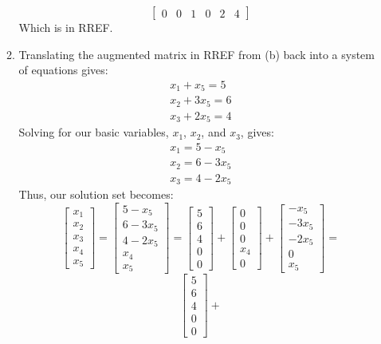 \documentclass{article}
\begin{document}
\begin{enumerate}
\begin{enumerate}
$$\begin{bmatrix}
            0 & 0 & 1 & 0 & 2 & 4
        \end{bmatrix}$$
        Which is in RREF. 
        \item Translating the augmented matrix in RREF from (b) back into a system of equations gives:
        \begin{align*}
            x_1 + x_5 = 5 \\ 
            x_2 + 3x_5 = 6 \\ 
            x_3 + 2x_5 = 4
        \end{align*}
        Solving for our basic variables, \(x_1\), \(x_2\), and \(x_3\), gives:
        \begin{align*}
            x_1 = 5 - x_5 \\ 
            x_2 = 6 - 3x_5 \\ 
            x_3 = 4 - 2x_5
        \end{align*}
        Thus, our solution set becomes:
        \[ \begin{bmatrix} x_1 \\ x_2 \\ x_3 \\ x_4 \\ x_5 \end{bmatrix} = 
        \begin{bmatrix} 5 - x_5 \\ 6 - 3x_5 \\ 4 - 2x_5 \\ x_4 \\ x_5 \end{bmatrix} = 
        \begin{bmatrix} 5 \\ 6 \\ 4 \\ 0 \\ 0  \end{bmatrix} + 
        \begin{bmatrix} 0 \\ 0 \\ 0 \\ x_4 \\ 0 \end{bmatrix} + 
        \begin{bmatrix} - x_5 \\ - 3x_5 \\ - 2x_5 \\ 0 \\ x_5 \end{bmatrix} = \]
        \[ \begin{bmatrix} 5 \\ 6 \\ 4 \\ 0 \\ 0  \end{bmatrix} + 
\]
\end{enumerate}
\end{enumerate}
\end{document}
